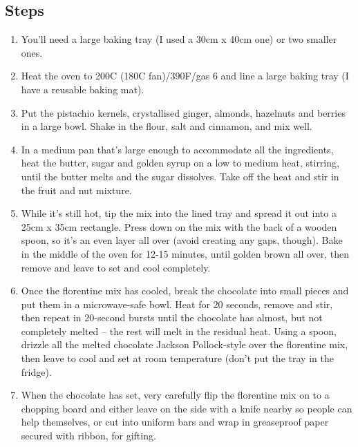 \documentclass{book}
\begin{document}
\subsection*{Steps}
\begin{enumerate}
\item You’ll need a large baking tray (I used a 30cm x 40cm one) or two smaller ones.
\item Heat the oven to 200C (180C fan)/390F/gas 6 and line a large baking tray (I have a reusable baking mat).
\item Put the pistachio kernels, crystallised ginger, almonds, hazelnuts and berries in a large bowl. Shake in the flour, salt and cinnamon, and mix well.
\item In a medium pan that’s large enough to accommodate all the ingredients, heat the butter, sugar and golden syrup on a low to medium heat, stirring, until the butter melts and the sugar dissolves. Take off the heat and stir in the fruit and nut mixture.
\item While it’s still hot, tip the mix into the lined tray and spread it out into a 25cm x 35cm rectangle. Press down on the mix with the back of a wooden spoon, so it’s an even layer all over (avoid creating any gaps, though). Bake in the middle of the oven for 12-15 minutes, until golden brown all over, then remove and leave to set and cool completely.
\item Once the florentine mix has cooled, break the chocolate into small pieces and put them in a microwave-safe bowl. Heat for 20 seconds, remove and stir, then repeat in 20-second bursts until the chocolate has almost, but not completely melted – the rest will melt in the residual heat. Using a spoon, drizzle all the melted chocolate Jackson Pollock-style over the florentine mix, then leave to cool and set at room temperature (don’t put the tray in the fridge).
\item When the chocolate has set, very carefully flip the florentine mix on to a chopping board and either leave on the side with a knife nearby so people can help themselves, or cut into uniform bars and wrap in greaseproof paper secured with ribbon, for gifting.
\end{enumerate}
\newpage
\end{document}
